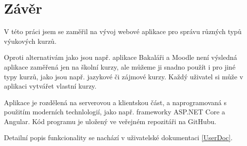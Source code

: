 \chapter*{Závěr}

V této práci jsem se zaměřil na vývoj webové aplikace pro správu různých typů výukových kurzů.

Oproti alternativám jako jsou např. aplikace Bakaláři a Moodle není výsledná aplikace zaměřená jen na školní kurzy, 
ale můžeme ji snadno použít i pro jiné typy kurzů, jako jsou např. jazykové či zájmové kurzy. 
Každý uživatel si může v aplikaci vytvářet vlastní kurzy.

Aplikace je rozdělená na serverovou a klientskou část, a naprogramovaná s použitím moderních technlologií, 
jako např. frameworky ASP.NET Core a Angular. Kód programu je uložený ve veřejném repozitáři na GitHubu.

Detailní popis funkcionality se nachází v uživatelské dokumentaci \ref{UserDoc}.
